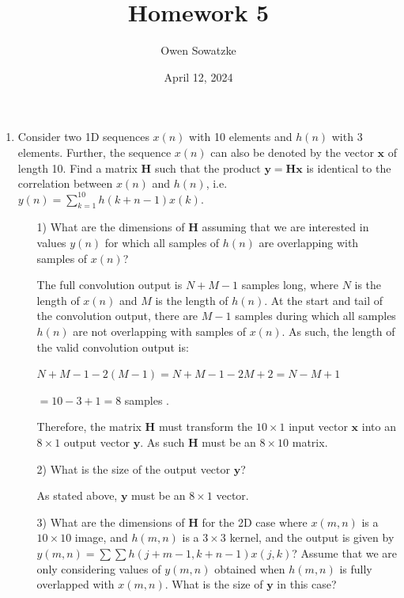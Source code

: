 \documentclass[fleqn]{article}
\title{Homework 5}
\author{Owen Sowatzke}
\date{April 12, 2024}
\newcommand{\zerodisplayskip}{
	\setlength{\abovedisplayskip}{0pt}%
	\setlength{\belowdisplayskip}{0pt}%
	\setlength{\abovedisplayshortskip}{0pt}%
	\setlength{\belowdisplayshortskip}{0pt}%
	\setlength{\mathindent}{0pt}}
\begin{document}
	\offinterlineskip
	\setlength{\lineskip}{12pt}
	\zerodisplayskip
	\maketitle
	
	\begin{enumerate}
		\item Consider two 1D sequences $x(n)$ with 10 elements and $h(n)$ with 3 elements. Further, the sequence $x(n)$ can also be denoted by the vector $\mathbf{x}$ of length 10. Find a matrix $\mathbf{H}$ such that the product $\mathbf{y} = \mathbf{Hx}$ is identical to the correlation between $x(n)$ and $h(n)$, i.e. $y(n) = \sum_{k=1}^{10}{h(k+n-1)x(k)}$.
		
		\begin{enumerate}
			\item [1)] What are the dimensions of $\mathbf{H}$ assuming that we are interested in values $y(n)$ for which all samples of $h(n)$ are overlapping with samples of $x(n)$?
			
			The full convolution output is $N + M - 1$ samples long, where $N$ is the length of $x(n)$ and $M$ is the length of $h(n)$. At the start and tail of the convolution output, there are $M - 1$ samples during which all samples $h(n)$ are not overlapping with samples of $x(n)$. As such, the length of the valid convolution output is:
			
			$N + M - 1 - 2(M - 1) = N + M - 1 - 2M + 2 = N - M + 1$
			
			$ = 10 - 3 + 1 = 8$ samples .
			
			Therefore, the matrix $\mathbf{H}$ must transform the $10 \times 1$ input vector $\mathbf{x}$ into an $8 \times 1$ output vector $\mathbf{y}$.  As such $\mathbf{H}$ must be an $8 \times 10$ matrix.
			
			\item [2)] What is the size of the output vector $\mathbf{y}$?
			
			As stated above, $\mathbf{y}$ must be an $8 \times 1$ vector.
			
			\item [3)] What are the dimensions of $\mathbf{H}$ for the 2D case where $x(m,n)$ is a $10 \times 10$ image, and $h(m,n)$ is a $3 \times 3$ kernel, and the output is given by $y(m,n) = \sum{\sum{h(j+m-1,k+n-1)x(j,k)}}$? Assume that we are only considering values of $y(m,n)$ obtained when $h(m,n)$ is fully overlapped with $x(m,n)$. What is the size of $\mathbf{y}$ in this case?
			

\end{enumerate}
\end{enumerate}
\end{document}
